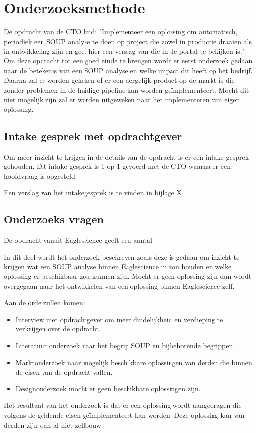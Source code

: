 
\chapter{Onderzoeksmethode} %

\label{OnderzoeksMethode} %

De opdracht van de CTO luid: "Implementeer een oplossing om automatisch, periodiek een SOUP analyse te doen op project die zowel in productie draaien als in ontwikkeling zijn en geef hier een verslag van die in de portal te bekijken is." Om deze opdracht tot een goed einde te brengen wordt er eerst onderzoek gedaan naar de betekenis van een SOUP analyse en welke impact dit heeft op het bedrijf. Daarna zal er worden gekeken of er een dergelijk product op de markt is die zonder problemen in de huidige pipeline kan worden ge\"implementeert. Mocht dit niet mogelijk zijn zal er worden uitgeweken naar het implementeren van eigen oplossing. 


\section{Intake gesprek met opdrachtgever}
Om meer inzicht te krijgen in de details van de opdracht is er een intake gesprek gehouden. Dit intake gesprek is 1 op 1 gevoerd met de CTO waarna er een hoofdvraag is opgesteld 

Een verslag van het intakegesprek is te vinden in bijlage X%

\section{Onderzoeks vragen}
De opdracht vanuit Eaglescience geeft een aantal 


In dit deel wordt het onderzoek beschreven zoals deze is gedaan om inzicht te krijgen wat een SOUP analyse binnen Eaglescience in zou houden en welke oplossing er beschikbaar zou kunnen zijn. Mocht er geen oplossing zijn dan wordt overgegaan naar het ontwikkelen van een oplossing binnen Eaglescience zelf.

Aan de orde zullen komen:
\begin{itemize}
\item Interview met opdrachtgever om meer duidelijkheid en verdieping te verkrijgen over de opdracht.
\item Literatuur onderzoek naar het begrip SOUP en bijbehorende begrippen.
\item Marktonderzoek naar mogelijk beschikbare oplossingen van derden die binnen de eisen van de opdracht vallen.
\item Designonderzoek mocht er geen beschikbare oplossingen zijn.
\end{itemize}

Het resultaat van het onderzoek is dat er een oplossing wordt aangedragen die volgens de geldende eisen ge\"implementeert kan worden. Deze oplossing kan van derden zijn dan al niet zelfbouw. 






